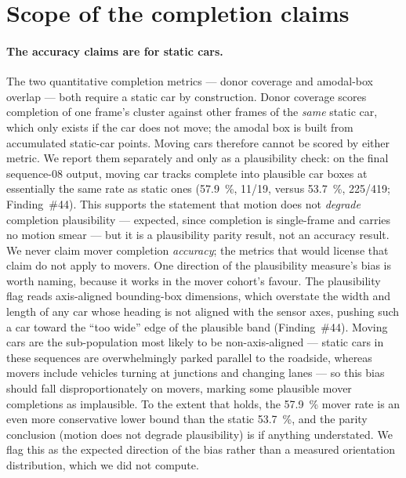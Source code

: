 \section{Scope of the completion claims}
\label{sec:disc-completion-scope}

\paragraph{The accuracy claims are for static cars.}
The two quantitative completion metrics --- donor coverage and amodal-box overlap ---
both require a static car by construction. Donor coverage scores completion of one
frame's cluster against other frames of the \emph{same} static car, which only exists
if the car does not move; the amodal box is built from accumulated static-car points.
Moving cars therefore cannot be scored by either metric. We report them separately and
only as a plausibility check: on the final sequence-08 output, moving car tracks
complete into plausible car boxes at essentially the same rate as static ones
(\SI{57.9}{\percent}, \num{11}/\num{19}, versus \SI{53.7}{\percent}, \num{225}/\num{419};
Finding~\#44). This supports the statement that motion does not \emph{degrade}
completion plausibility --- expected, since completion is single-frame and carries no
motion smear --- but it is a plausibility parity result, not an accuracy result. We never
claim mover completion \emph{accuracy}; the metrics that would license that claim do not
apply to movers. One direction of the plausibility measure's bias is worth naming, because
it works in the mover cohort's favour. The plausibility flag reads axis-aligned bounding-box
dimensions, which overstate the width and length of any car whose heading is not aligned
with the sensor axes, pushing such a car toward the ``too wide'' edge of the plausible band
(Finding~\#44). Moving cars are the sub-population most likely to be non-axis-aligned ---
static cars in these sequences are overwhelmingly parked parallel to the roadside, whereas
movers include vehicles turning at junctions and changing lanes --- so this bias should fall
disproportionately on movers, marking some plausible mover completions as implausible. To
the extent that holds, the \SI{57.9}{\percent} mover rate is an even more conservative lower
bound than the static \SI{53.7}{\percent}, and the parity conclusion (motion does not
degrade plausibility) is if anything understated. We flag this as the expected direction of
the bias rather than a measured orientation distribution, which we did not compute.

